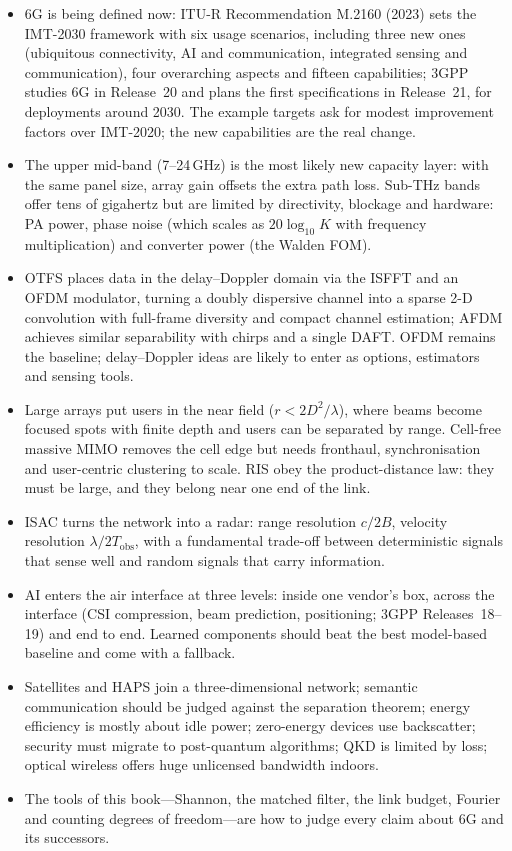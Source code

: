 \begin{itemize}
\item 6G is being defined now: ITU-R Recommendation M.2160 (2023) sets the IMT-2030 framework with six
usage scenarios, including three new ones (ubiquitous connectivity, AI and communication, integrated
sensing and communication), four overarching aspects and fifteen capabilities; 3GPP studies 6G in
Release~20 and plans the first specifications in Release~21, for deployments around 2030. The example
targets ask for modest improvement factors over IMT-2020; the new capabilities are the real change.
\item The upper mid-band (7--24\,GHz) is the most likely new capacity layer: with the same panel size,
array gain offsets the extra path loss. Sub-THz bands offer tens of gigahertz but are limited by
directivity, blockage and hardware: PA power, phase noise (which scales as $20\log_{10}K$ with frequency
multiplication) and converter power (the Walden FOM).
\item OTFS places data in the delay--Doppler domain via the ISFFT and an OFDM modulator, turning a
doubly dispersive channel into a sparse 2-D convolution with full-frame diversity and compact channel
estimation; AFDM achieves similar separability with chirps and a single DAFT. OFDM remains the
baseline; delay--Doppler ideas are likely to enter as options, estimators and sensing tools.
\item Large arrays put users in the near field ($r<2D^2/\lambda$), where beams become focused spots with
finite depth and users can be separated by range. Cell-free massive MIMO removes the cell edge but
needs fronthaul, synchronisation and user-centric clustering to scale. RIS obey the product-distance
law: they must be large, and they belong near one end of the link.
\item ISAC turns the network into a radar: range resolution $c/2B$, velocity resolution $\lambda/2T_{\text{obs}}$,
with a fundamental trade-off between deterministic signals that sense well and random signals that
carry information.
\item AI enters the air interface at three levels: inside one vendor's box, across the interface (CSI
compression, beam prediction, positioning; 3GPP Releases~18--19) and end to end. Learned components
should beat the best model-based baseline and come with a fallback.
\item Satellites and HAPS join a three-dimensional network; semantic communication should be judged
against the separation theorem; energy efficiency is mostly about idle power; zero-energy devices
use backscatter; security must migrate to post-quantum algorithms; QKD is limited by loss; optical
wireless offers huge unlicensed bandwidth indoors.
\item The tools of this book---Shannon, the matched filter, the link budget, Fourier and counting
degrees of freedom---are how to judge every claim about 6G and its successors.
\end{itemize}

